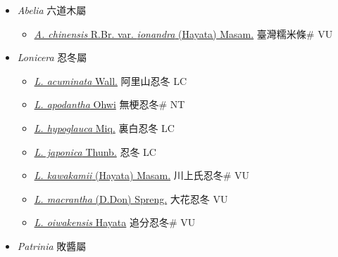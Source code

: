 
  \begin{itemize}
 \item[] \textit{Abelia} 六道木屬
                    
  \begin{itemize}
        \item[] \href{http://www.theplantlist.org/tpl1.1/search?q=Abelia+chinensis+var.+ionandra}{\textit{A. chinensis} R.Br. var. \textit{ionandra} (Hayata) Masam.}   臺灣糯米條\# VU
  \end{itemize}
 \item[] \textit{Lonicera} 忍冬屬
                    
  \begin{itemize}
        \item[] \href{http://www.theplantlist.org/tpl1.1/search?q=Lonicera+acuminata}{\textit{L. acuminata} Wall.}   阿里山忍冬 LC
        \item[] \href{http://www.theplantlist.org/tpl1.1/search?q=Lonicera+apodantha}{\textit{L. apodantha} Ohwi}   無梗忍冬\# NT
        \item[] \href{http://www.theplantlist.org/tpl1.1/search?q=Lonicera+hypoglauca}{\textit{L. hypoglauca} Miq.}   裏白忍冬 LC
        \item[] \href{http://www.theplantlist.org/tpl1.1/search?q=Lonicera+japonica}{\textit{L. japonica} Thunb.}   忍冬 LC
        \item[] \href{http://www.theplantlist.org/tpl1.1/search?q=Lonicera+kawakamii}{\textit{L. kawakamii} (Hayata) Masam.}   川上氏忍冬\# VU
        \item[] \href{http://www.theplantlist.org/tpl1.1/search?q=Lonicera+macrantha}{\textit{L. macrantha} (D.Don) Spreng.}   大花忍冬 VU
        \item[] \href{http://www.theplantlist.org/tpl1.1/search?q=Lonicera+oiwakensis}{\textit{L. oiwakensis} Hayata}   追分忍冬\# VU
  \end{itemize}
 \item[] \textit{Patrinia} 敗醬屬
                    

\end{itemize}
